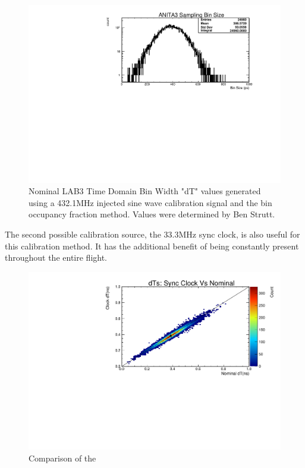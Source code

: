 	
	\begin{figure}
		\includegraphics[width=\textwidth]{figures/dTNominal}
		\caption{Nominal LAB3 Time Domain Bin Width "dT" values generated using a 432.1MHz injected sine wave calibration signal and the bin occupancy fraction method.  Values were determined by Ben Strutt\cite{benSThesis}.}
		\label{fig:dTNominal}
	\end{figure}
		
		The second possible calibration source, the 33.3MHz sync clock, is also useful for this calibration method.  It has the additional benefit of being constantly present throughout the entire flight.
		
		
	\begin{figure}
		\includegraphics[width=\textwidth]{figures/nominalDtVsSyncClockDt}
		\caption{Comparison of the }
		\label{fig:dTNominal2D}
	\end{figure}



